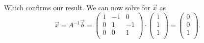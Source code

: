 Which confirms our result. We can now solve for $\Vec{x}$ as
\[ 
\Vec{x} = A^{-1} \Vec{b} = \begin{pmatrix}1 & -1 & 0\\0 & 1 & -1\\0 & 0 & 1\\\end{pmatrix} \cdot \begin{pmatrix}1\\1\\1\\\end{pmatrix} = \left(\begin{array}{c} 0 \\ 0 \\ 1 \\\end{array}\right)
.\]


